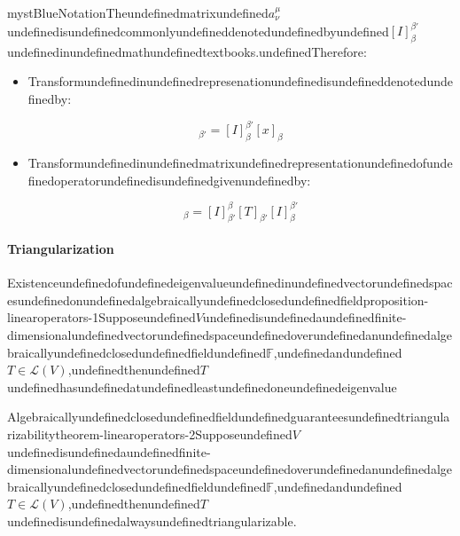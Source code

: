 \begin{mystadmonition}{mystBlue}{Notation}Theundefinedmatrixundefined$a_{\nu}^{\mu}$undefinedisundefinedcommonlyundefineddenotedundefinedbyundefined$[I]_{\beta}^{\beta'}$undefinedinundefinedmathundefinedtextbooks.undefinedTherefore:

\begin{itemize}
\item Transformundefinedinundefinedrepresenationundefinedisundefineddenotedundefinedby:

\begin{equation}
[x]_{\beta'}=[I]_{\beta}^{\beta'}[x]_{\beta}
\end{equation}


\item Transformundefinedinundefinedmatrixundefinedrepresentationundefinedofundefinedoperatorundefinedisundefinedgivenundefinedby:

\begin{equation}
[T]_{\beta}=[I]_{\beta'}^{\beta}[T]_{\beta'}[I]_{\beta}^{\beta'}
\end{equation}
\end{itemize}

\end{mystadmonition}
\paragraph{Triangularization}

\begin{mystthmproposition}{Existenceundefinedofundefinedeigenvalueundefinedinundefinedvectorundefinedspacesundefinedonundefinedalgebraicallyundefinedclosedundefinedfield}{proposition-linearoperators-1}Supposeundefined$V$undefinedisundefinedaundefinedfinite-dimensionalundefinedvectorundefinedspaceundefinedoverundefinedanundefinedalgebraicallyundefinedclosedundefinedfieldundefined$\mathbb{F}$,undefinedandundefined$T\in \mathcal L(V)$,undefinedthenundefined$T$undefinedhasundefinedatundefinedleastundefinedoneundefinedeigenvalue

\end{mystthmproposition}
\begin{mystthmtheorem}{Algebraicallyundefinedclosedundefinedfieldundefinedguaranteesundefinedtriangularizability}{theorem-linearoperators-2}Supposeundefined$V$undefinedisundefinedaundefinedfinite-dimensionalundefinedvectorundefinedspaceundefinedoverundefinedanundefinedalgebraicallyundefinedclosedundefinedfieldundefined$\mathbb{F}$,undefinedandundefined$T\in \mathcal L(V)$,undefinedthenundefined$T$undefinedisundefinedalwaysundefinedtriangularizable.

\end{mystthmtheorem}
